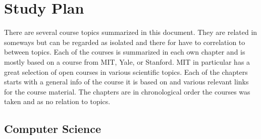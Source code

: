 \documentclass{book}
\author{Anton Augustsson}
\begin{document}
\maketitle
\newpage
\tableofcontents
\newpage



\chapter{Study Plan}
There are several course topics summarized in this document.
They are related in someways but can be regarded as isolated and there for have to correlation to between topics.
Each of the courses is summarized in each own chapter and is mostly based on a course from MIT, Yale, or Stanford.
MIT in particular has a great selection of open courses in various scientific topics. Each of the chapters starts
with a general info of the course it is based on and various relevant links for the course material.
The chapters are in chronological order the courses was taken and as no relation to topics.
\newpage

\section{Computer Science}
\resizebox{0.9\textwidth}{!}{} \newpage


\newcommand{\pathCS}{chapters}


\newcommand{\pathCA}{\pathCS/Computer-Architecture}  \newpage

\newcommand{\pathLINUX}{\pathCS/Linux}  \newpage
\newcommand{\pathRTOS}{\pathCS/Real-Time-Operating-System}  \newpage
\newcommand{\pathRTS}{\pathCS/Real-Time-Systems}  \newpage

\newcommand{\pathNETWORKING}{\pathCS/Networking}  \newpage

\newcommand{\pathPDDS}{\pathCS/Program-Design-and-Data-Structures}  \newpage

\newcommand{\pathIML}{\pathCS/Introduction-to-Machine-Learning}  \newpage
\newcommand{\pathNMS}{\pathCS/Numerical-Methods-and-Simulation}  \newpage
\newcommand{\pathIPP}{\pathCS/Introduction-to-Parallel-Programming}  \newpage
\newcommand{\pathASD}{\pathCS/Advanced-Software-Design}  \newpage
\end{document}
